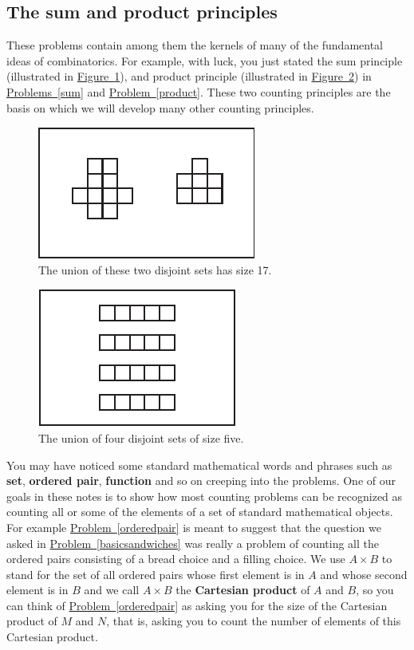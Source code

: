 \documentclass[10pt,]{book}
\newcommand{\terminology}[1]{\textbf{#1}}
\theoremstyle{plain}
\theoremstyle{definition}
\theoremstyle{definition}
\numberwithin{equation}{chapter}
\begin{document}
\subsection[{The sum and product principles}]{The sum and product principles}\label{subsection-1}
These problems contain among them the kernels of many of the fundamental ideas of combinatorics. For example, with luck, you just  stated the sum principle (illustrated in \hyperref[sumprinc]{Figure~\ref{sumprinc}}), and product principle (illustrated in \hyperref[prodprinc]{Figure~\ref{prodprinc}}) in \hyperref[sum]{Problems~\ref{sum}} and \hyperref[product]{Problem~\ref{product}}. These two counting principles are the basis on which we will develop many other counting principles.%
\begin{figure}
\centering
\includegraphics[width=0.5\linewidth]{images/SumPrinc}
\caption{The union of these two disjoint sets has size 17.\label{sumprinc}}
\end{figure}
\begin{figure}
\centering
\includegraphics[width=0.5\linewidth]{images/ProdPrinc}
\caption{The union of four disjoint sets of size five.\label{prodprinc}}
\end{figure}
You may have noticed some standard mathematical words and phrases such as \terminology{set}, \terminology{ordered pair}, \terminology{function} and so on creeping into the problems. One of our goals in these notes is to show how most counting problems can be recognized as counting all or some of the elements of a set of standard mathematical objects. For example \hyperref[orderedpair]{Problem~\ref{orderedpair}} is meant to suggest that the question we asked in \hyperref[basicsandwiches]{Problem~\ref{basicsandwiches}} was really a problem of counting all the ordered pairs consisting of a bread choice and a filling choice. We use \(A\times B\) to stand for the set of all ordered pairs whose first element is in \(A\) and whose second element is in \(B\) and we call \(A\times B\) the \terminology{Cartesian product} of \(A\) and \(B\), so you can think of \hyperref[orderedpair]{Problem~\ref{orderedpair}} as asking you for the size of the Cartesian product of \(M\) and \(N\), that is, asking you to count the number of elements of this Cartesian product.%
\end{document}
